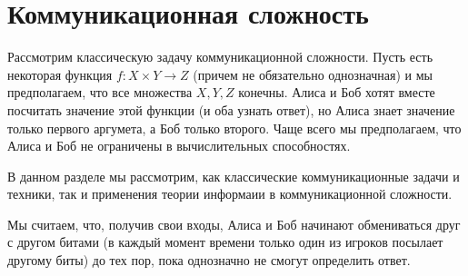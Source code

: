 \section{Коммуникационная сложность}

Рассмотрим классическую задачу коммуникационной сложности. Пусть есть некоторая функция $f\colon X \times
Y \to Z$ (причем не обязательно однозначная) и мы предполагаем, что все множества $X, Y, Z$
конечны. Алиса и Боб хотят вместе посчитать значение этой функции (и оба узнать ответ), но Алиса знает
значение только первого аргумета, а Боб только второго. Чаще всего мы предполагаем, что Алиса и Боб не
ограничены в вычислительных способностях.

В данном разделе мы рассмотрим, как классические коммуникационные задачи и техники, так и применения
теории информаии в коммуникационной сложности.

Мы считаем, что, получив свои входы, Алиса и Боб начинают обмениваться друг с другом битами (в каждый
момент времени только один из игроков посылает другому биты) до тех пор,
пока однозначно не смогут определить ответ.

\begin{figure}[h]
    \centering
    
\end{figure}

